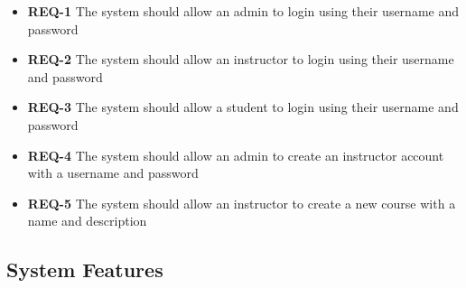 \documentclass{article}
\begin{document}
\begin{itemize}
  \item \textbf{REQ-1} The system should allow an admin to login using their username and password
  \item \textbf{REQ-2} The system should allow an instructor to login using their username and password
  \item \textbf{REQ-3} The system should allow a student to login using their username and password
  \item \textbf{REQ-4} The system should allow an admin to create an instructor account with a username and password
  \item \textbf{REQ-5} The system should allow an instructor to create a new course with a name and description
\end{itemize}

\subsection{System Features}
\end{document}
